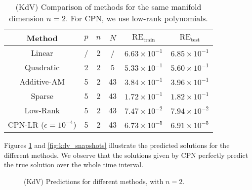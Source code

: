 \begin{table}[h]
\centering %

\begin{tabular}{|c|c|c|c|c|c|}
\hline
 Method & $p$  & $n$ & $N$ & $ \text{RE}_{\text{train}} $ & $ \text{RE}_{\text{test}} $ \\ 
 \hline
 Linear & / &  2  & / & $6.63 \times 10^{-1}$  & $ 6.85 \times 10^{-1} $ \\ 
 \hline
 Quadratic &  2 & 2 & 5 & $ 5.33 \times 10^{-1}$  & $ 5.60 \times 10^{-1}$  \\ 
 \hline
Additive-AM & 5 & 2 & 43 & $ 3.84 \times 10^{-1}$  & $ 3.96 \times 10^{-1} $  \\
 \hline
 Sparse &  5 & 2 & 43 & $ 1.72 \times 10^{-1} $  & $ 1.82 \times 10^{-1} $  \\
 \hline
 Low-Rank & 5 & 2 & 43 & $7.47 \times 10^{-2}$ & $7.94 \times 10^{-2}$ \\
 \hline
 CPN-LR ($\epsilon = 10^{-4}$) &  5 & 2 & 43 & $ 6.73 \times 10^{-5} $ & $ 6.91 \times 10^{-5} $ \\ 
 \hline
\end{tabular}
\caption{(KdV) Comparison of methods for the same manifold dimension $ n = 2 $. For CPN, we use low-rank polynomials.}
\label{tab:kdv_comparison_table}
\end{table}

Figures \ref{fig:kdv_viz_solution} and \ref{fig:kdv_snapshots} illustrate the predicted solutions for the different methods. We observe that the solutions given by CPN perfectly predict the true solution over the whole time interval.  


\begin{figure}[h]
    \centering
    \caption{(KdV) Predictions for different methods, with $ n = 2 $.}
    \label{fig:kdv_viz_solution}
\end{figure}

